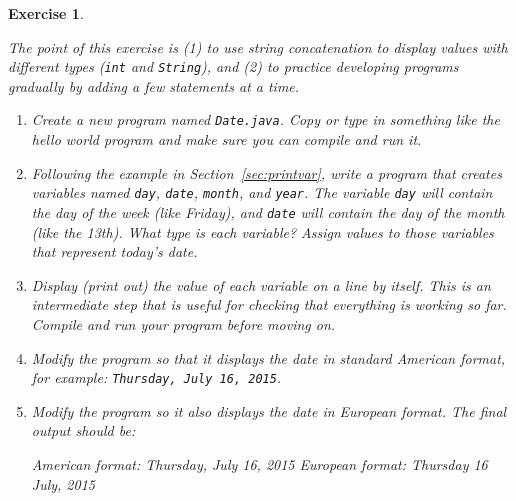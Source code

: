 \documentclass[12pt]{book}
\theoremstyle{exercise}
\newtheorem{exercise}{Exercise}[chapter]
\newcommand{\java}[1]{\verb"#1"}
\begin{document}
\begin{exercise}
\label{ex:date}

The point of this exercise is (1) to use string concatenation to display values with different types (\java{int} and \java{String}), and (2) to practice developing programs gradually by adding a few statements at a time.

\begin{enumerate}

\item Create a new program named {\tt Date.java}.
Copy or type in something like the hello world program and make sure you can compile and run it.

\item Following the example in Section~\ref{sec:printvar}, write a program that creates variables named \java{day}, \java{date}, \java{month}, and \java{year}.
The variable \java{day} will contain the day of the week (like Friday), and \java{date} will contain the day of the month (like the 13th).
What type is each variable?
Assign values to those variables that represent today's date.

\item Display (print out) the value of each variable on a line by itself.
This is an intermediate step that is useful for checking that everything is working so far.
Compile and run your program before moving on.

\item Modify the program so that it displays the date in standard American format, for example: {\tt Thursday, July 16, 2015}.

\item Modify the program so it also displays the date in European format.
The final output should be:

\begin{stdout}
American format:
Thursday, July 16, 2015
European format:
Thursday 16 July, 2015
\end{stdout}

\end{enumerate}

\end{exercise}
\end{document}
